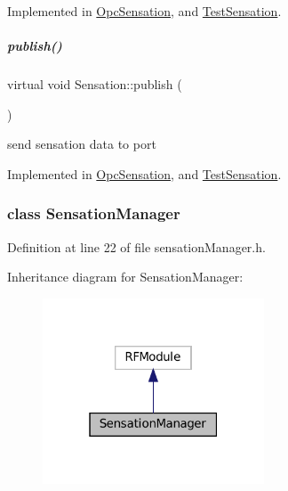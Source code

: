 Implemented in \hyperlink{group__sensationManager_accf106fa56c11f31095bfb2258feea03}{Opc\+Sensation}, and \hyperlink{group__sensationManager_aa09c7e493d895039e889bc7c3c92ee52}{Test\+Sensation}.

\mbox{\label{group__sensationManager_ad37c802d993694d36f6794e597b35c8c}} 
\subparagraph{\texorpdfstring{publish()}{publish()}}
{\footnotesize\ttfamily virtual void Sensation\+::publish (\begin{DoxyParamCaption}{ }\end{DoxyParamCaption})\hspace{0.3cm}{\ttfamily [pure virtual]}}



send sensation data to port 



Implemented in \hyperlink{group__sensationManager_aeec83c521a72fcc52558f6f3df2f48c9}{Opc\+Sensation}, and \hyperlink{group__sensationManager_ab97ecc34efb14126e76b70446a9d5866}{Test\+Sensation}.

\label{classSensationManager}
\subsubsection{class Sensation\+Manager}


Definition at line 22 of file sensation\+Manager.\+h.



Inheritance diagram for Sensation\+Manager\+:
\nopagebreak
\begin{figure}[H]
\begin{center}
\leavevmode
\includegraphics[width=187pt]{classSensationManager__inherit__graph}
\end{center}
\end{figure}

